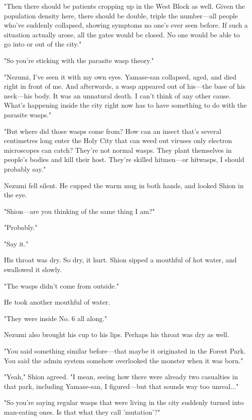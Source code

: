 "Then there should be patients cropping up in the West Block as well.
Given the population density here, there should be double, triple the
number---all people who've suddenly collapsed, showing symptoms no one's
ever seen before. If such a situation actually arose, all the gates
would be closed. No one would be able to go into or out of the city."

"So you're sticking with the parasite wasp theory."

"Nezumi, I've seen it with my own eyes. Yamase-san collapsed, aged, and
died right in front of me. And afterwards, a wasp appeared out of
his---the base of his neck---his body. It was an unnatural death. I can't
think of any other cause. What's happening inside the city right now has
to have something to do with the parasite wasps."

"But where did those wasps come from? How can an insect that's several
centimetres long enter the Holy City that can weed out viruses only
electron microscopes can catch? They're not normal wasps. They plant
themselves in people's bodies and kill their host. They're skilled
hitmen---or hitwasps, I should probably say."

Nezumi fell silent. He cupped the warm mug in both hands, and looked
Shion in the eye.

"Shion---are you thinking of the same thing I am?"

"Probably."

"Say it."

His throat was dry. So dry, it hurt. Shion sipped a mouthful of hot
water, and swallowed it slowly.

"The wasps didn't come from outside."

He took another mouthful of water.

"They were inside No. 6 all along."

Nezumi also brought his cup to his lips. Perhaps his throat was dry as
well.

"You said something similar before---that maybe it originated in the
Forest Park. You said the admin system somehow overlooked the monster
when it was born."

"Yeah," Shion agreed. "I mean, seeing how there were already two
casualties in that park, including Yamase-san, I figured---but that sounds
way too unreal..."

"So you're saying regular wasps that were living in the city suddenly
turned into man-eating ones. Is that what they call 'mutation'?"

